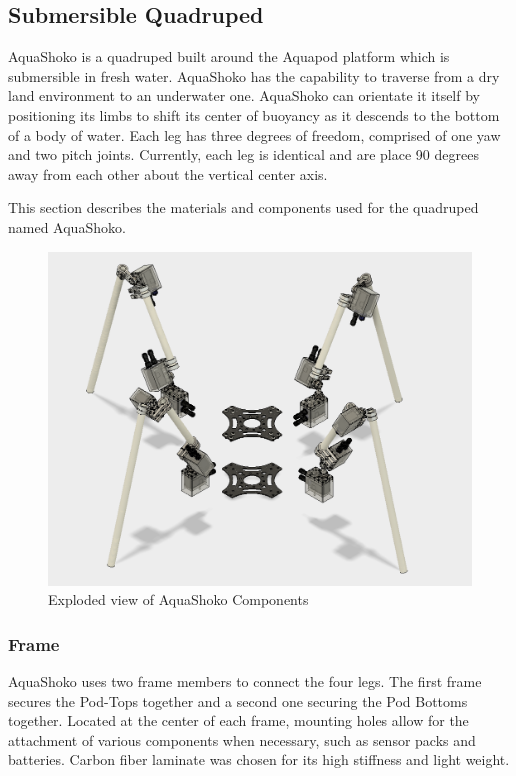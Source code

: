 \subsection{Submersible Quadruped}
AquaShoko is a quadruped built around the Aquapod platform which is submersible in fresh water. AquaShoko has the capability to traverse from a dry land environment to an underwater one. AquaShoko can orientate it itself by positioning its limbs to shift its center of buoyancy as it descends to the bottom of a body of water. Each leg has three degrees of freedom, comprised of one yaw and two pitch joints. Currently, each leg is identical and are place 90 degrees away from each other about the vertical center axis. 

This section describes the materials and components used for the quadruped named AquaShoko.


\begin{figure}[h]
\centering
\includegraphics[width=1.0\columnwidth]{./img/aquaShoko-v3dot3-exploded-assembly.png}
\caption{Exploded view of AquaShoko Components}
\label{fig:shoko exploded}
\end{figure}


\subsubsection{Frame}
AquaShoko uses two frame members to connect the four legs. The first frame secures the Pod-Tops together and a second one securing the Pod Bottoms together. Located at the center of each frame, mounting holes allow for the attachment of various components when necessary, such as sensor packs and batteries. Carbon fiber laminate was chosen for its high stiffness and light weight.

